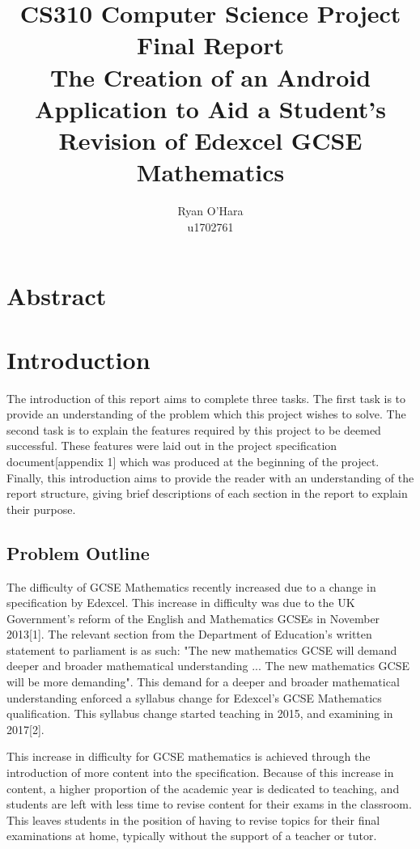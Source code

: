 \documentclass{article}
\title{CS310 Computer Science Project \\ Final Report \\ The Creation of an Android Application to Aid a Student's Revision of Edexcel GCSE Mathematics}
\author{Ryan O'Hara \\ u1702761}
\begin{document}
\maketitle

\newpage

\tableofcontents

\newpage

\section{Abstract}
\label{section:abstract}

%
%
%
%
%
%
%

\section{Introduction}
\label{section:introduction}

The introduction of this report aims to complete three tasks. The first task is to provide an understanding of the problem which this project wishes to solve. The second task is to explain the features required by this project to be deemed successful. These features were laid out in the project specification document[appendix 1] which was produced at the beginning of the project. Finally, this introduction aims to provide the reader with an understanding of the report structure, giving brief descriptions of each section in the report to explain their purpose.

\subsection{Problem Outline}

The difficulty of GCSE Mathematics recently increased due to a change in specification by Edexcel. This increase in difficulty was due to the UK Government's reform of the English and Mathematics GCSEs in November 2013[1]. The relevant section from the Department of Education's written statement to parliament is as such: "The new mathematics GCSE will demand deeper and broader mathematical understanding ...  The new mathematics GCSE will be more demanding". This demand for a deeper and broader mathematical understanding enforced a syllabus change for Edexcel's GCSE Mathematics qualification. This syllabus change started teaching in 2015, and examining in 2017[2]. \par

This increase in difficulty for GCSE mathematics is achieved through the introduction of more content into the specification. Because of this increase in content, a higher proportion of the academic year is dedicated to teaching, and students are left with less time to revise content for their exams in the classroom. This leaves students in the position of having to revise topics for their final examinations at home, typically without the support of a teacher or tutor. \par
\end{document}
